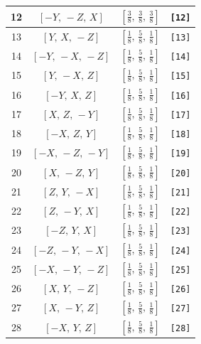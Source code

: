 \documentclass[fleqn,8pt]{jsarticle}
\begin{document}
\begin{longtable}{cccc}
12 & $\left[ - Y,\, - Z,\, X \right]$ & $\left[ \frac{3}{8},\, \frac{3}{8},\, \frac{3}{8} \right]$ & {\tt [12]} \\ \hline
13 & $\left[ Y,\, X,\, - Z \right]$ & $\left[ \frac{1}{8},\, \frac{5}{8},\, \frac{1}{8} \right]$ & {\tt [13]} \\ \hline
14 & $\left[ - Y,\, - X,\, - Z \right]$ & $\left[ \frac{1}{8},\, \frac{5}{8},\, \frac{1}{8} \right]$ & {\tt [14]} \\ \hline
15 & $\left[ Y,\, - X,\, Z \right]$ & $\left[ \frac{1}{8},\, \frac{5}{8},\, \frac{1}{8} \right]$ & {\tt [15]} \\ \hline
16 & $\left[ - Y,\, X,\, Z \right]$ & $\left[ \frac{1}{8},\, \frac{5}{8},\, \frac{1}{8} \right]$ & {\tt [16]} \\ \hline
17 & $\left[ X,\, Z,\, - Y \right]$ & $\left[ \frac{1}{8},\, \frac{5}{8},\, \frac{1}{8} \right]$ & {\tt [17]} \\ \hline
18 & $\left[ - X,\, Z,\, Y \right]$ & $\left[ \frac{1}{8},\, \frac{5}{8},\, \frac{1}{8} \right]$ & {\tt [18]} \\ \hline
19 & $\left[ - X,\, - Z,\, - Y \right]$ & $\left[ \frac{1}{8},\, \frac{5}{8},\, \frac{1}{8} \right]$ & {\tt [19]} \\ \hline
20 & $\left[ X,\, - Z,\, Y \right]$ & $\left[ \frac{1}{8},\, \frac{5}{8},\, \frac{1}{8} \right]$ & {\tt [20]} \\ \hline
21 & $\left[ Z,\, Y,\, - X \right]$ & $\left[ \frac{1}{8},\, \frac{5}{8},\, \frac{1}{8} \right]$ & {\tt [21]} \\ \hline
22 & $\left[ Z,\, - Y,\, X \right]$ & $\left[ \frac{1}{8},\, \frac{5}{8},\, \frac{1}{8} \right]$ & {\tt [22]} \\ \hline
23 & $\left[ - Z,\, Y,\, X \right]$ & $\left[ \frac{1}{8},\, \frac{5}{8},\, \frac{1}{8} \right]$ & {\tt [23]} \\ \hline
24 & $\left[ - Z,\, - Y,\, - X \right]$ & $\left[ \frac{1}{8},\, \frac{5}{8},\, \frac{1}{8} \right]$ & {\tt [24]} \\ \hline
25 & $\left[ - X,\, - Y,\, - Z \right]$ & $\left[ \frac{1}{8},\, \frac{5}{8},\, \frac{1}{8} \right]$ & {\tt [25]} \\ \hline
26 & $\left[ X,\, Y,\, - Z \right]$ & $\left[ \frac{1}{8},\, \frac{5}{8},\, \frac{1}{8} \right]$ & {\tt [26]} \\ \hline
27 & $\left[ X,\, - Y,\, Z \right]$ & $\left[ \frac{1}{8},\, \frac{5}{8},\, \frac{1}{8} \right]$ & {\tt [27]} \\ \hline
28 & $\left[ - X,\, Y,\, Z \right]$ & $\left[ \frac{1}{8},\, \frac{5}{8},\, \frac{1}{8} \right]$ & {\tt [28]} \\ \hline

\end{longtable}
\end{document}
